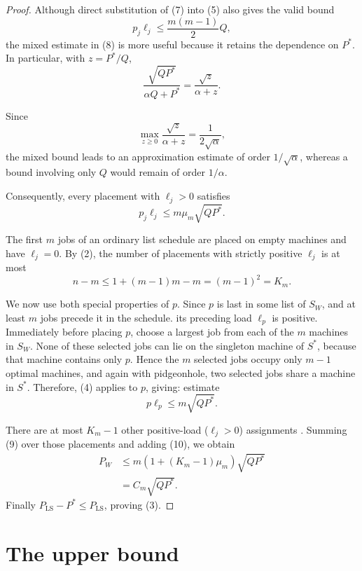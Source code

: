 \documentclass[11pt]{article}
\newcommand{\LS}{\mathrm{LS}}
\begin{document}
\begin{proof}
Although direct substitution of (7) into (5) also gives the valid bound
\[
p_j\ell_j\le \frac{m(m-1)}{2}Q,
\]
the mixed estimate in (8) is more useful because it retains the dependence
on \(P^*\). In particular, with \(z=P^*/Q\),
\[
\frac{\sqrt{QP^*}}{\alpha Q+P^*}
=
\frac{\sqrt z}{\alpha+z}.
\]

Since
\[
\max_{z\ge0}\frac{\sqrt z}{\alpha+z}
=
\frac{1}{2\sqrt{\alpha}},
\]
the mixed bound leads to an approximation estimate of order
\(1/\sqrt{\alpha}\), whereas a bound involving only \(Q\) would remain of
order \(1/\alpha\).

Consequently, every placement with \(\ell_j>0\) satisfies
\[
 p_j\ell_j\le m\mu_m\sqrt{QP^*}.
\tag{9}
\]

The first \(m\) jobs of an ordinary list schedule are placed on empty
machines and have \(\ell_j=0\).  By (2), the number of placements with strictly
positive $\ell_j$ is at most
\[
 n-m\le 1+(m-1)m - m = (m-1)^2=K_m.
\]

We now use both special properties of \(p\). Since \(p\) is last in some list of $S_{W}$,
and at least $m$ jobs precede it in the schedule. its preceding load \(\ell_p\) is positive.  Immediately before placing \(p\),
choose a largest job from each of the \(m\) machines in $S_W$.  None of these
selected jobs can lie on the singleton machine of $S^*$, because that
machine contains only \(p\).  Hence the \(m\) selected jobs occupy only
\(m-1\) optimal machines, and again with pidgeonhole, two selected jobs share a machine in $S^*$.
Therefore, (4) applies to \(p\), giving: 
estimate
\[
 p\ell_p\le m\sqrt{QP^*}.
\tag{10}
\]

There are at most \(K_m-1\) other positive-load ($\ell_j > 0$) assignments .  Summing (9)
over those placements and adding (10), we obtain
\[
\begin{aligned}
 P_{W}
 &\le
 m\left(1+(K_m-1)\mu_m\right)\sqrt{QP^*}\\
 &=C_m\sqrt{QP^*}.
\end{aligned}
\]
Finally \(P_{\LS}-P^*\le P_{\LS}\), proving (3).
\end{proof}

\section{The upper bound}
\end{document}
